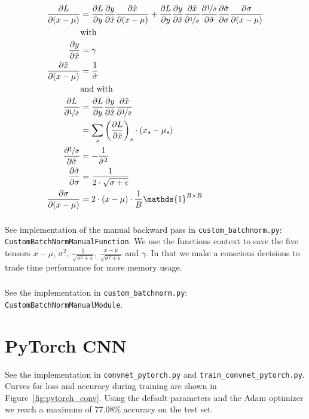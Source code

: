 \documentclass{article}
\newcommand\·{\ensuremath{\cdot}}
\newcommand\…{\ensuremath{\dots}}
\renewcommand\t{\ensuremath{\times}}
\newcommand{\⇔}{\ensuremath{\iff}}
\newcommand{\⇐}{\ensuremath{\impliedby}}
\newcommand{\⇒}{\ensuremath{\implies}}
\newcommand\f[2]{\ensuremath{\frac{#1}{#2}}}
\newcommand\nf[2]{\ensuremath{\nicefrac{#1}{#2}}}
\newcommand\pf[2]{\ensuremath{\frac{\partial {#1}}{\partial {#2}}}}
\newcommand\1{\ensuremath{\mathds{1}}}
\newcommand\ℝ{\ensuremath{\mathds{R}}}
\begin{document}
\begin{align*}
  \pf{L}{(x-\mu)} &= \pf{L}{y}\pf{y}{\hat{x}}\pf{\hat{x}}{(x-\mu)} + \pf{L}{y}\pf{y}{\hat{x}}\pf{\hat{x}}{\nf{1}{\hat{\sigma}}}\pf{\nf{1}{\hat{\sigma}}}{\hat{\sigma}}\pf{\hat{\sigma}}{\sigma}\pf{\sigma}{(x-\mu)}\\
  &\text{with}\\
  \pf{y}{\hat{x}} &= \gamma\\
  \pf{\hat{x}}{(x-\mu)} &= \f{1}{\hat{\sigma}}\\
  &\text{and with}\\
  \pf{L}{\nf{1}{\hat{\sigma}}}
  &= \pf{L}{y}\pf{y}{\hat{x}}\pf{\hat{x}}{\nf{1}{\hat{\sigma}}}\\
  &= \sum_s \left(\pf{L}{\hat{x}}\right)_s\·(x_s-\mu_s)\\
  \pf{\nf{1}{\hat{\sigma}}}{\hat{\sigma}} &= -\f{1}{\hat{\sigma}^2}\\
  \pf{\hat{\sigma}}{\sigma} &= \f{1}{2\·\sqrt{\sigma+\epsilon}}\\
  \pf{\sigma}{(x-\mu)} &= 2\·(x-\mu)\·\f{1}{B}\1^{B\t B}\\
\end{align*}

\subsubsection{}
See implementation of the manual backward pass in \texttt{custom\_batchnorm.py}: \texttt{CustomBatchNormManualFunction}.
We use the functions context to save the five tensors $x-\mu$, $\sigma^2$, $\f{1}{\sqrt{\sigma^2 +\epsilon}}$, $\f{x-\mu}{\sqrt{\sigma^2 +\epsilon}}$ and $\gamma$.
In that we make a conscious decisions to trade time performance for more memory usage.

\subsubsection{}
See the implementation in \texttt{custom\_batchnorm.py}: \texttt{CustomBatchNormManualModule}.

\section{PyTorch CNN}
See the implementation in \texttt{convnet\_pytorch.py} and  \texttt{train\_convnet\_pytorch.py}.
Curves for loss and accuracy during training are shown in Figure~\ref{fig:pytorch_conv}.
Using the default parameters and  the Adam optimizer we reach a maximum of 77.08\% accuracy on the test set.
\end{document}
